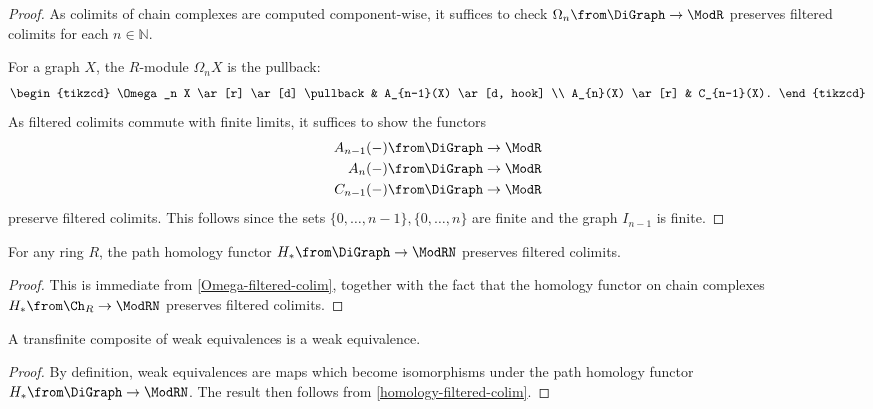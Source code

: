 \begin{proof}
As colimits of chain complexes are computed component-wise, it suffices to check $\Omega_n \from \DiGraph \to \ModR$ preserves filtered colimits for each $n \in \mathbb{N}$.
    
    For a graph $X$, the $R$-module $\Omega_n X$ is the pullback:
    \[ \begin{tikzcd}
        \Omega_n X \ar[r] \ar[d] \pullback & A_{n-1}(X) \ar[d, hook] \\
        A_{n}(X) \ar[r] & C_{n-1}(X).
    \end{tikzcd} \]
    As filtered colimits commute with finite limits, it suffices to show the functors
    \begin{align*}
        A_{n-1}(-) \from \DiGraph \to \ModR \\
        A_n(-) \from \DiGraph \to \ModR \\
        C_{n-1}(-) \from \DiGraph \to \ModR
    \end{align*}
    preserve filtered colimits.
    This follows since the sets $\{ 0, \dots, n-1 \}, \{ 0, \dots, n \}$ are finite and the graph $I_{n-1}$ is finite.
\end{proof}

\begin{corollary} \label{homology-filtered-colim}
    For any ring $R$, the path homology functor $H_* \from \DiGraph \to \ModRN$ preserves filtered colimits.
\end{corollary}
\begin{proof}
    This is immediate from \cref{Omega-filtered-colim}, together with the fact that the homology functor on chain complexes $H_* \from \Ch_R \to \ModRN$ preserves filtered colimits.
\end{proof}

\begin{proposition} \label{weq-transf-comp}
    A transfinite composite of weak equivalences is a weak equivalence.
\end{proposition}
\begin{proof}
    By definition, weak equivalences are maps which become isomorphisms under the path homology functor $H_* \from \DiGraph \to \ModRN$.
    The result then follows from \cref{homology-filtered-colim}.
\end{proof}


